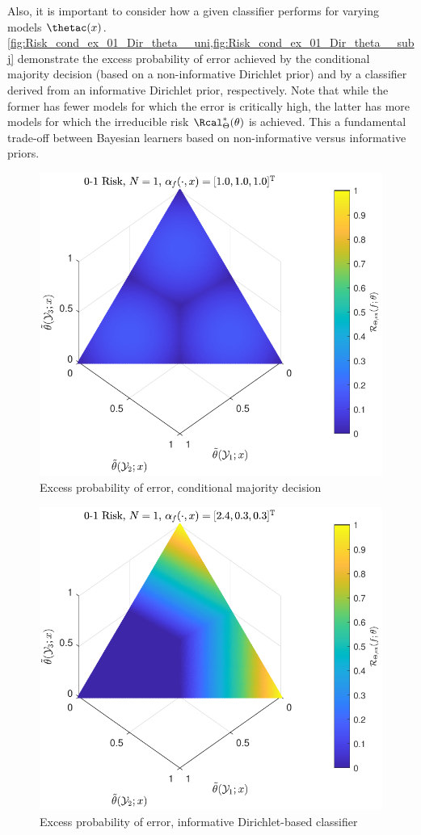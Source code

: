 \documentclass[12pt]{report}
\begin{document}
Also, it is important to consider how a given classifier performs for varying models $\thetac(x)$. \cref{fig:Risk_cond_ex_01_Dir_theta__uni,fig:Risk_cond_ex_01_Dir_theta__subj}  demonstrate the excess probability of error achieved by the conditional majority decision (based on a non-informative Dirichlet prior) and by a classifier derived from an informative Dirichlet prior, respectively. Note that while the former has fewer models for which the error is critically high, the latter has more models for which the irreducible risk $\Rcal_{\Theta}^*(\theta)$ is achieved. This a fundamental trade-off between Bayesian learners based on non-informative versus informative priors.
\begin{figure}
\centering
\includegraphics[width=0.7\linewidth]{Risk_cond_ex_01_Dir_theta__uni.pdf}
\caption{Excess probability of error, conditional majority decision}
\label{fig:Risk_cond_ex_01_Dir_theta__uni}
\end{figure}
%
\begin{figure}
\centering
\includegraphics[width=0.7\linewidth]{Risk_cond_ex_01_Dir_theta__subj.pdf}
\caption{Excess probability of error, informative Dirichlet-based classifier}
\label{fig:Risk_cond_ex_01_Dir_theta__subj}
\end{figure}
\end{document}
